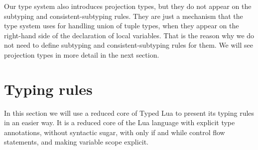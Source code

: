 Our type system also introduces projection types, but they do not
appear on the subtyping and consistent-subtyping rules.
They are just a mechanism that the type system uses for handling
union of tuple types, when they appear on the right-hand side of
the declaration of local variables.
That is the reason why we do not need to define subtyping and
consistent-subtyping rules for them.
We will see projection types in more detail in the next section.

\section{Typing rules}

In this section we will use a reduced core of Typed Lua to present
its typing rules in an easier way.
It is a reduced core of the Lua language with explicit type annotations,
without syntactic sugar, with only if and while control flow statements,
and making variable scope explicit.

